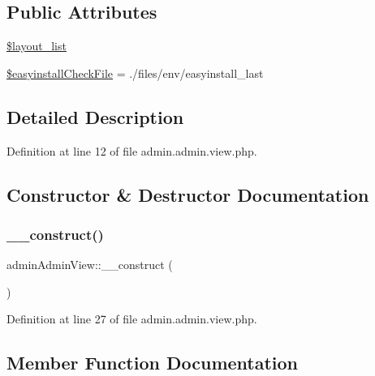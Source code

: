\subsection*{Public Attributes}
\begin{DoxyCompactItemize}
\item 
\hyperlink{classadminAdminView_a3655428ad4a88938daaa0a44c1ff96ea}{\$layout\+\_\+list}
\item 
\hyperlink{classadminAdminView_a3cfff18fed688e8cf67f4f8bbba79abf}{\$easyinstall\+Check\+File} = \textquotesingle{}./files/env/easyinstall\+\_\+last\textquotesingle{}
\end{DoxyCompactItemize}


\subsection{Detailed Description}


Definition at line 12 of file admin.\+admin.\+view.\+php.



\subsection{Constructor \& Destructor Documentation}
\hypertarget{classadminAdminView_a8bf927cf8a3c6554d083a29f90a8e3eb}{}\label{classadminAdminView_a8bf927cf8a3c6554d083a29f90a8e3eb} 
\subsubsection{\texorpdfstring{\+\_\+\+\_\+construct()}{\_\_construct()}}
{\footnotesize\ttfamily admin\+Admin\+View\+::\+\_\+\+\_\+construct (\begin{DoxyParamCaption}{ }\end{DoxyParamCaption})}



Definition at line 27 of file admin.\+admin.\+view.\+php.



\subsection{Member Function Documentation}
\hypertarget{classadminAdminView_ad1fe5e140900ad8f5814871ed6ae9508}{}\label{classadminAdminView_ad1fe5e140900ad8f5814871ed6ae9508} 
